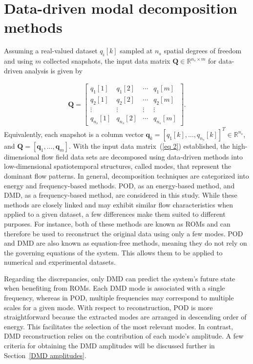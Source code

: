 \documentclass[a4paper,fleqn]{cas-sc}
\begin{document}
	\section{Data-driven modal decomposition methods}
	\label{Data-driven methods}
	
	Assuming a real-valued dataset $q_i[k]$ sampled at $n_s$ spatial degrees of freedom and using $m$ collected snapshots, the input data matrix $\mathbf{Q}\in \mathbb{R}^{n_s\times m}$ for data-driven analysis is given by
	
	\begin{align}
		\mathbf{Q} = \begin{bmatrix}
			q_{1}[1] & q_{1}[2] & \cdots & q_{1}[m] \\
			q_{2}[1] & q_{2}[2] & \cdots & q_{2}[m] \\
			\vdots & \vdots & \vdots & \vdots \\
			q_{n_s}[1] & q_{n_s}[2] & \cdots & q_{n_s}[m]
		\end{bmatrix}.\label{eq 2}
	\end{align}
	\noindent Equivalently, each snapshot is a column vector $\mathbf{q}_k=[q_1[k],\ldots,q_{n_s}[k]]^T\in\mathbb{R}^{n_s}$, and $\mathbf{Q}=[\mathbf{q}_1,\ldots,\mathbf{q}_m]$.
	\noindent With the input data matrix~(\ref{eq 2}) established, the high-dimensional flow field data sets are decomposed using data-driven methods into low-dimensional spatiotemporal structures, called modes, that represent the dominant flow patterns. In general, decomposition techniques are categorized into energy and frequency-based methods. POD, as an energy-based method, and DMD, as a frequency-based method, are considered in this study. While these methods are closely linked and may exhibit similar flow characteristics when applied to a given dataset, a few differences make them suited to different purposes. For instance, both of these methods are known as ROMs and can therefore be used to reconstruct the original data using only a few modes. POD and DMD are also known as equation-free methods, meaning they do not rely on the governing equations of the system. This allows them to be applied to numerical and experimental datasets.
	
	Regarding the discrepancies, only DMD can predict the system's future state when benefiting from ROMs. Each DMD mode is associated with a single frequency, whereas in POD, multiple frequencies may correspond to multiple scales for a given mode. With respect to reconstruction, POD is more straightforward because the extracted modes are arranged in descending order of energy. This facilitates the selection of the most relevant modes. In contrast, DMD reconstruction relies on the contribution of each mode's amplitude. A few criteria for obtaining the DMD amplitudes will be discussed further in Section~\ref{DMD amplitudes}.  
	
\end{document}
